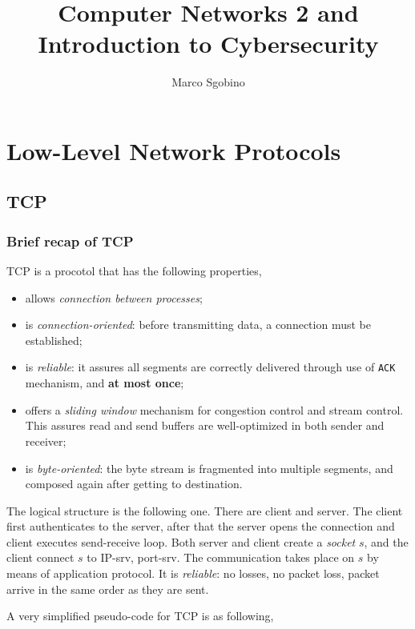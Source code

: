 \documentclass[a4paper, 12pt]{report}
\begin{document}
\title{Computer Networks 2 and Introduction to Cybersecurity}
\author{Marco Sgobino}
\maketitle
\tableofcontents

\part{Low-Level Network Protocols}

\chapter{TCP}

\section{Brief recap of TCP}
TCP is a procotol that has the following properties,

\begin{itemize}
	\item allows \emph{connection between processes};
	\item is \emph{connection-oriented}: before transmitting data, a
		connection must be established;
	\item is \emph{reliable}: it assures all segments are correctly
		delivered through use of \texttt{ACK} mechanism, and \textbf{at
		most once};
	\item offers a \emph{sliding window} mechanism for congestion control
		and stream control. This assures read and send buffers are
		well-optimized in both sender and receiver;
	\item is \emph{byte-oriented}: the byte stream is fragmented into
		multiple segments, and composed again after getting to
		destination.
\end{itemize}

The logical structure is the following one. There are client and server. The
client first authenticates to the server, after that the server opens the
connection and client executes send-receive loop. Both server and client create
a \emph{socket} $s$, and the client connect $s$ to IP-srv, port-srv. The
communication takes place on $s$ by means of application protocol. It is
\emph{reliable}: no losses, no packet loss, packet arrive in the same order as
they are sent.

A very simplified pseudo-code for TCP is as following,
\end{document}
